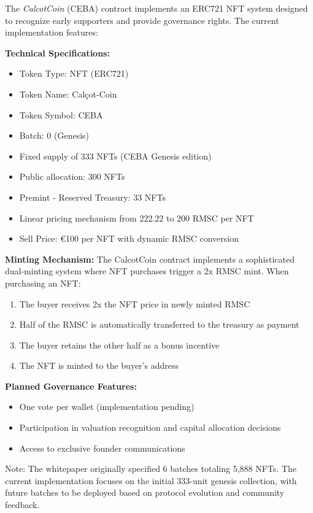 \documentclass[conference]{IEEEtran}
\begin{document}
The \textit{CalcotCoin} (CEBA) contract implements an ERC721 NFT system designed to recognize early supporters and provide governance rights. The current implementation features:

\textbf{Technical Specifications:}
\begin{itemize}
    \item Token Type: NFT (ERC721)
    \item Token Name: Calçot-Coin
    \item Token Symbol: CEBA
    \item Batch: 0 (Genesis)
    \item Fixed supply of 333 NFTs (CEBA Genesis edition)
    \item Public allocation: 300 NFTs
    \item Premint - Reserved Treasury: 33 NFTs
    \item Linear pricing mechanism from 222.22 to 200 RMSC per NFT
    \item Sell Price: €100 per NFT with dynamic RMSC conversion
\end{itemize}

\textbf{Minting Mechanism:}
The CalcotCoin contract implements a sophisticated dual-minting system where NFT purchases trigger a 2x RMSC mint. When purchasing an NFT:
\begin{enumerate}
    \item The buyer receives 2x the NFT price in newly minted RMSC
    \item Half of the RMSC is automatically transferred to the treasury as payment
    \item The buyer retains the other half as a bonus incentive
    \item The NFT is minted to the buyer's address
\end{enumerate}

\textbf{Planned Governance Features:}
\begin{itemize}
    \item One vote per wallet (implementation pending)
    \item Participation in valuation recognition and capital allocation decisions
    \item Access to exclusive founder communications
\end{itemize}

Note: The whitepaper originally specified 6 batches totaling 5,888 NFTs. The current implementation focuses on the initial 333-unit genesis collection, with future batches to be deployed based on protocol evolution and community feedback.
\end{document}
